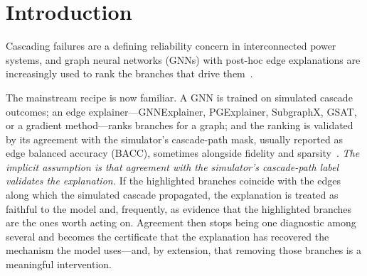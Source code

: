 \section{Introduction}\label{introduction}

Cascading failures are a defining reliability concern in interconnected power systems, and graph neural networks (GNNs) with post-hoc edge explanations are increasingly used to rank the branches that drive them~\citep{guo2023,cadini2017,gjorgiev2022,varbella2023gdl,varbella2024,liao2022}.

The mainstream recipe is now familiar. A GNN is trained on simulated cascade outcomes; an edge explainer---GNNExplainer, PGExplainer, SubgraphX, GSAT, or a gradient method---ranks branches for a graph; and the ranking is validated by its agreement with the simulator's cascade-path mask, usually reported as edge balanced accuracy (BACC), sometimes alongside fidelity and sparsity~\citep{varbella2024,ying2019,luo2020,yuan2021,miao2022,yuan2022}. \emph{The implicit assumption is that agreement with the simulator's cascade-path label validates the explanation.} If the highlighted branches coincide with the edges along which the simulated cascade propagated, the explanation is treated as faithful to the model and, frequently, as evidence that the highlighted branches are the ones worth acting on. Agreement then stops being one diagnostic among several and becomes the certificate that the explanation has recovered the mechanism the model uses---and, by extension, that removing those branches is a meaningful intervention.

